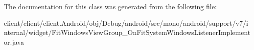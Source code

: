 The documentation for this class was generated from the following file\+:\begin{DoxyCompactItemize}
\item 
client/client/client.\+Android/obj/\+Debug/android/src/mono/android/support/v7/internal/widget/Fit\+Windows\+View\+Group\+\_\+\+On\+Fit\+System\+Windows\+Listener\+Implementor.\+java\end{DoxyCompactItemize}
